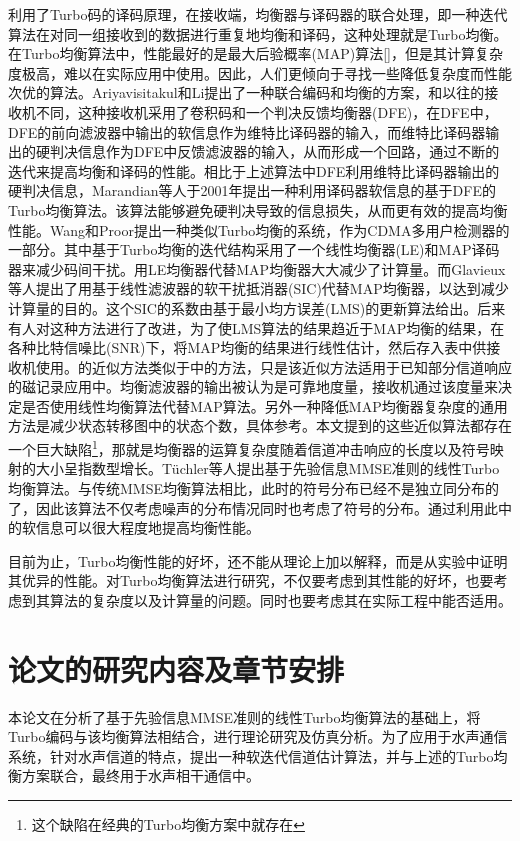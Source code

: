 利用了Turbo码的译码原理，在接收端，均衡器与译码器的联合处理，即一种迭代算法在对同一组接收到的数据进行重复地均衡和译码，这种处理就是Turbo均衡\citep{douillard1995,Anastasopoulos1997}。
在Turbo均衡算法中，性能最好的是最大后验概率(MAP)算法[]，但是其计算复杂度极高，难以在实际应用中使用。因此，人们更倾向于寻找一些降低复杂度而性能次优的算法。Ariyavisitakul和Li\citep{ariyavisitakul1998}提出了一种联合编码和均衡的方案，和以往的接收机不同，这种接收机采用了卷积码和一个判决反馈均衡器(DFE)，在DFE中，DFE的前向滤波器中输出的软信息作为维特比译码器的输入，而维特比译码器输出的硬判决信息作为DFE中反馈滤波器的输入，从而形成一个回路，通过不断的迭代来提高均衡和译码的性能。相比于上述算法中DFE利用维特比译码器\citep{Joachim1989}输出的硬判决信息，Marandian等人\citep{Marandian}于2001年提出一种利用译码器软信息的基于DFE的Turbo均衡算法。该算法能够避免硬判决导致的信息损失，从而更有效的提高均衡性能。Wang和Proor\citep{wang1999iterative}提出一种类似Turbo均衡的系统，作为CDMA多用户检测器的一部分。其中基于Turbo均衡的迭代结构采用了一个线性均衡器(LE)和MAP译码器来减少码间干扰。用LE均衡器代替MAP均衡器大大减少了计算量。而Glavieux\citep{glavieux1997turbo}等人提出了用基于线性滤波器的软干扰抵消器(SIC)代替MAP均衡器，以达到减少计算量的目的。这个SIC的系数由基于最小均方误差(LMS)的更新算法给出。后来有人对这种方法进行了改进，为了使LMS算法的结果趋近于MAP均衡的结果，在各种比特信噪比(SNR)下，将MAP均衡的结果进行线性估计，然后存入表中供接收机使用\citep{raphaeli2000}。\citep{wu2000turbo}的近似方法类似于\citep{glavieux1997turbo}中的方法，只是该近似方法适用于已知部分信道响应的磁记录应用中。均衡滤波器的输出被认为是可靠地度量，接收机通过该度量来决定是否使用线性均衡算法代替MAP算法。另外一种降低MAP均衡器复杂度的通用方法是减少状态转移图中的状态个数，具体参考\citep{Berthet2000}。本文提到的这些近似算法都存在一个巨大缺陷\footnote{这个缺陷在经典的Turbo均衡方案中就存在}，那就是均衡器的运算复杂度随着信道冲击响应的长度以及符号映射的大小呈指数型增长。T{\"u}chler\citep{Tuchler2002a,Tuchler,Tuchler2011}等人提出基于先验信息MMSE准则的线性Turbo均衡算法。与传统MMSE均衡算法相比，此时的符号分布已经不是独立同分布的了，因此该算法不仅考虑噪声的分布情况同时也考虑了符号的分布。通过利用此中的软信息可以很大程度地提高均衡性能。

目前为止，Turbo均衡性能的好坏，还不能从理论上加以解释，而是从实验中证明其优异的性能。对Turbo均衡算法进行研究，不仅要考虑到其性能的好坏，也要考虑到其算法的复杂度以及计算量的问题。同时也要考虑其在实际工程中能否适用。
\section{论文的研究内容及章节安排}
本论文在分析了基于先验信息MMSE准则的线性Turbo均衡算法的基础上，将Turbo编码与该均衡算法相结合，进行理论研究及仿真分析。为了应用于水声通信系统，针对水声信道的特点，提出一种软迭代信道估计算法，并与上述的Turbo均衡方案联合，最终用于水声相干通信中。

